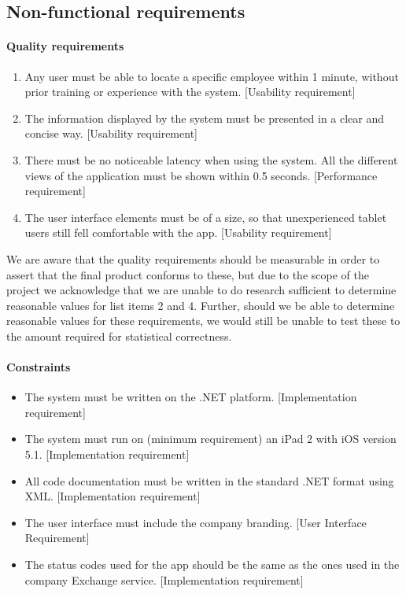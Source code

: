 \subsection{Non-functional requirements} %
\label{sub:Non-functional requirements}

\paragraph{Quality requirements} %
\label{ssub:Quality requirements}

\begin{enumerate}
\item Any user must be able to locate a specific employee within 1
  minute, without prior training or experience with the
  system. [Usability requirement]
\item The information displayed by the system must be presented in a
  clear and concise way. [Usability requirement]
\item There must be no noticeable latency when using the system. All
  the different views of the application must be shown within 0.5
  seconds. [Performance requirement]
\item The user interface elements must be of a size, so that
  unexperienced tablet users still fell comfortable with the
  app. [Usability requirement]
\end{enumerate}

We are aware that the quality requirements should be measurable in
order to assert that the final product conforms to these, but due to
the scope of the project we acknowledge that we are unable to do
research sufficient to determine reasonable values for list items 2
and 4. Further, should we be able to determine reasonable values for
these requirements, we would still be unable to test these to the
amount required for statistical correctness.

\paragraph{Constraints} %
\label{ssub:Constraints}

\begin{itemize}
    \item The system must be written on the .NET
      platform. [Implementation requirement]
    \item The system must run on (minimum requirement) an iPad 2 with
      iOS version 5.1. [Implementation requirement]
    \item All code documentation must be written in the standard .NET
      format using XML. [Implementation requirement]
    \item The user interface must include the company branding. [User
      Interface Requirement]
    \item The status codes used for the app should be the same as the
      ones used in the company Exchange service. [Implementation
        requirement]
\end{itemize}

